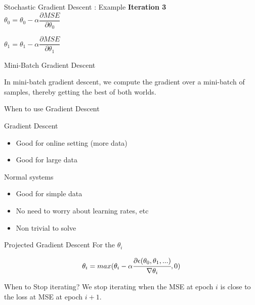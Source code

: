 \documentclass{beamer}
\begin{document}
\begin{frame}{Stochastic Gradient Descent : Example}
\textbf{Iteration 3}\\
\vspace{0.5cm}
$\theta_0 = \theta_0 - \alpha\dfrac{\partial MSE}{\partial \theta_0}$\\ 
\vspace{0.5cm}

$\theta_1 = \theta_1 - \alpha\dfrac{\partial MSE}{\partial \theta_1}$\\ 
\vspace{0.5cm}
\end{frame}

	
	\begin{frame}{Mini-Batch Gradient Descent}
		
		In mini-batch gradient descent, we compute the gradient over a mini-batch of samples, thereby getting the best of both worlds.
		
	\end{frame}
	
	\begin{frame}{When to use Gradient Descent}
		
		
		Gradient Descent
		\begin{itemize}
			\item Good for online setting (more data)
			\item Good for large data
		\end{itemize}
		
		
		Normal systems
		\begin{itemize}
			\item Good for simple data
			\item No need to worry about learning rates, etc
			\item Non trivial to solve
		\end{itemize}
	\end{frame}
	
	
	
	\begin{frame}{Projected Gradient Descent}
		For the $\theta_{i}$
		
		\begin{equation*}
		\theta_{i} = max(\theta_{i} - \alpha \cfrac{\partial \epsilon (\theta_{0},\theta_{1},...)}{ \nabla  \theta_{i}},0)
		\end{equation*}
	\end{frame}
	

	
	\begin{frame}{When to Stop iterating?}
		We stop iterating when the MSE at epoch $i$ is close to the loss at MSE at epoch $i+1$.
	\end{frame}
	
\end{document}
